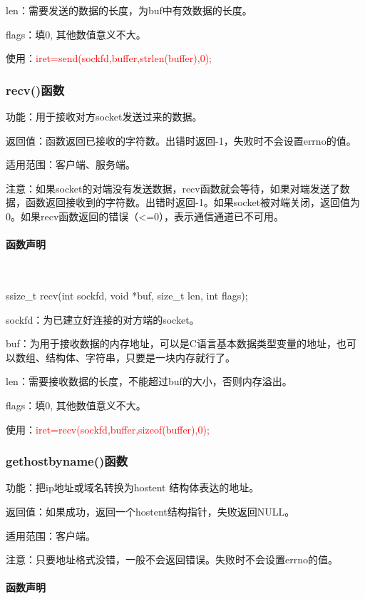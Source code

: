 \documentclass[UTF8]{article}%
\begin{document}
len：需要发送的数据的长度，为buf中有效数据的长度。

flags：填0, 其他数值意义不大。

使用：\textcolor{red}{iret=send(sockfd,buffer,strlen(buffer),0);}

\subsubsection{recv()函数}

功能：用于接收对方socket发送过来的数据。

返回值：函数返回已接收的字符数。出错时返回-1，失败时不会设置errno的值。

适用范围：客户端、服务端。

注意：如果socket的对端没有发送数据，recv函数就会等待，如果对端发送了数据，函数返回接收到的字符数。出错时返回-1。如果socket被对端关闭，返回值为0。如果recv函数返回的错误（<=0），表示通信通道已不可用。

\paragraph{函数声明}~{}

ssize\_t recv(int sockfd, void *buf, size\_t len, int flags);

sockfd：为已建立好连接的对方端的socket。

buf：为用于接收数据的内存地址，可以是C语言基本数据类型变量的地址，也可以数组、结构体、字符串，只要是一块内存就行了。

len：需要接收数据的长度，不能超过buf的大小，否则内存溢出。

flags：填0, 其他数值意义不大。

使用：\textcolor{red}{iret=recv(sockfd,buffer,sizeof(buffer),0);}

\subsubsection{gethostbyname()函数}

功能：把ip地址或域名转换为hostent 结构体表达的地址。

返回值：如果成功，返回一个hostent结构指针，失败返回NULL。

适用范围：客户端。

注意：只要地址格式没错，一般不会返回错误。失败时不会设置errno的值。

\paragraph{函数声明}~{}
\end{document}
